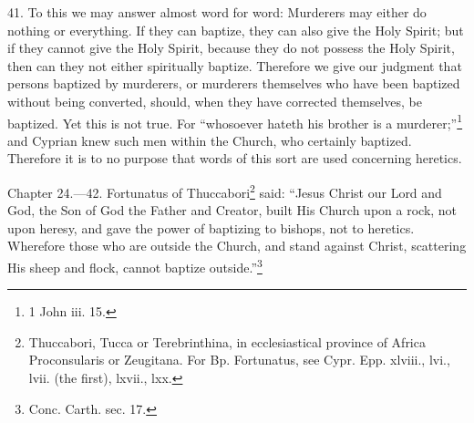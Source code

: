 41. To this we may answer almost word for word: Murderers may either do nothing or everything. If they can baptize, they can also give the Holy Spirit; but if they cannot give the Holy Spirit, because they do not possess the Holy Spirit, then can they not either spiritually baptize. Therefore we give our judgment that persons baptized by murderers, or murderers themselves who have been baptized without being converted, should, when they have corrected themselves, be baptized. Yet this is not true. For ``whosoever hateth his brother is a murderer;''\footnote{\par  1 John iii. 15.} and Cyprian knew such men within the Church, who certainly baptized. Therefore it is to no purpose that words of this sort are used concerning heretics.


Chapter 24.—42. Fortunatus of Thuccabori\footnote{\par  Thuccabori, Tucca or Terebrinthina, in ecclesiastical province of Africa Proconsularis or Zeugitana. For Bp. Fortunatus, see Cypr. Epp. xlviii., lvi., lvii. (the first), lxvii., lxx.} said: ``Jesus Christ our Lord and God, the Son of God the Father and Creator, built His Church upon a rock, not upon heresy, and gave the power of baptizing to bishops, not to heretics. Wherefore those who are outside the Church, and stand against Christ, scattering His sheep and flock, cannot baptize outside.''\footnote{\par  Conc. Carth. sec. 17.}

